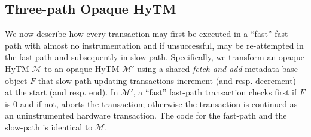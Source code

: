 \subsection{Three-path Opaque HyTM}
We now describe how every transaction may first be executed in a ``fast'' fast-path with almost no instrumentation
and if unsuccessful, may be re-attempted in the fast-path and subsequently in slow-path.
Specifically, we transform an opaque HyTM $\mathcal{M}$ to an opaque
HyTM $\mathcal{M}'$ using a shared \emph{fetch-and-add} metadata base object $F$ that slow-path updating transactions
increment (and resp. decrement) at the start (and resp. end). In $\mathcal{M}'$, a ``fast'' fast-path transaction checks first if $F$ is $0$
and if not, aborts the transaction; otherwise the transaction is continued as an uninstrumented hardware transaction.
The code for the fast-path and the slow-path is identical to $\mathcal{M}$.

%





